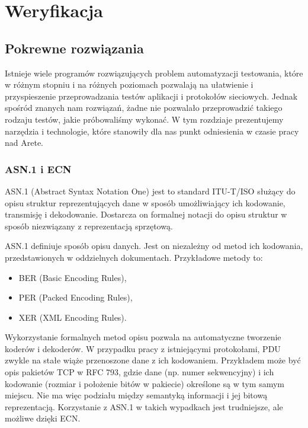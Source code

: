 \documentclass[00-praca-magisterska.tex]{subfiles}
\begin{document}
\chapter{Weryfikacja}



\section{Pokrewne rozwiązania}
\label{dostepne-rozwiazania}

Istnieje wiele programów rozwiązujących problem automatyzacji testowania, które
w różnym stopniu i na różnych poziomach pozwalają na ułatwienie i przyspieszenie
przeprowadzania testów aplikacji i protokołów sieciowych. Jednak spośród znanych
nam rozwiązań, żadne nie pozwalało przeprowadzić takiego rodzaju testów, jakie
próbowaliśmy wykonać. W tym rozdziaje prezentujemy narzędzia i technologie,
które stanowiły dla nas punkt odniesienia w czasie pracy nad Arete.

\subsection{ASN.1 i ECN}
\label{asn}
ASN.1 (Abstract Syntax Notation One) jest to standard ITU-T/ISO służący do opisu
struktur reprezentujących dane w sposób umożliwiający ich kodowanie, transmisję
i dekodowanie. Dostarcza on formalnej notacji do opisu struktur w sposób
niezwiązany z reprezentacją sprzętową.

ASN.1 definiuje sposób opisu danych. Jest on niezależny od metod ich kodowania,
przedstawionych w oddzielnych dokumentach. Przykładowe metody to:
\begin{itemize}
\item BER (Basic Encoding Rules),
\item PER (Packed Encoding Rules),
\item XER (XML Encoding Rules).
\end{itemize}

Wykorzystanie formalnych metod opisu pozwala na automatyczne tworzenie koderów i
dekoderów. W przypadku pracy z istniejącymi protokołami, PDU zwykle na stałe
wiąże przenoszone dane z ich kodowaniem. Przykładem może być opis pakietów TCP w
RFC 793, gdzie dane (np. numer sekwencyjny) i ich kodowanie (rozmiar i
położenie bitów w pakiecie) określone są w tym samym miejscu. Nie ma więc
podziału między semantyką informacji i jej bitową reprezentacją. Korzystanie z
ASN.1 w takich wypadkach jest trudniejsze, ale możliwe dzięki ECN.
\end{document}
